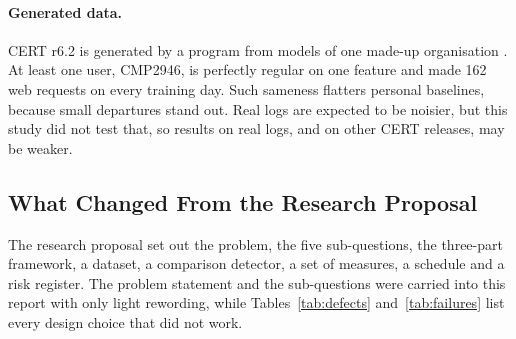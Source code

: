 \documentclass[a4paper,12pt]{article}
\begin{document}
\paragraph{Generated data.} CERT r6.2 is generated by a program from models of one made-up organisation \cite{Glasser2013}. At least one user, CMP2946, is perfectly regular on one feature and made 162 web requests on every training day. Such sameness flatters personal baselines, because small departures stand out. Real logs are expected to be noisier, but this study did not test that, so results on real logs, and on other CERT releases, may be weaker.

\subsection{What Changed From the Research Proposal}
\label{sec:retrospect}
The research proposal set out the problem, the five sub-questions, the three-part framework, a dataset, a comparison detector, a set of measures, a schedule and a risk register. The problem statement and the sub-questions were carried into this report with only light rewording, while Tables~\ref{tab:defects} and~\ref{tab:failures} list every design choice that did not work.
\end{document}
